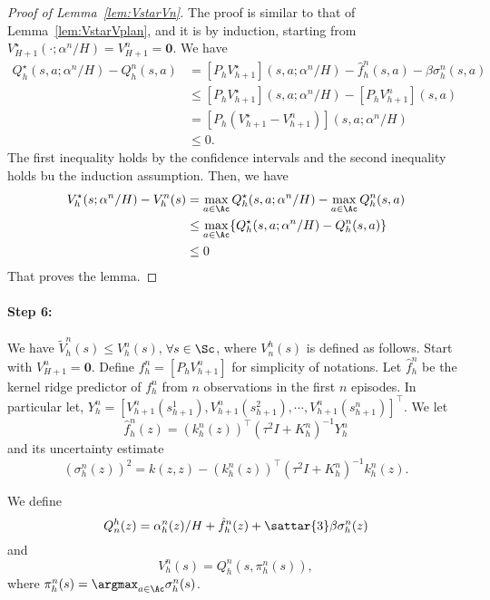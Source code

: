 \begin{proof}[Proof of Lemma~\ref{lem:VstarVn}]
The proof is similar to that of Lemma~\ref{lem:VstarVplan}, and it is by induction, starting from $V^{\star}_{H+1}(\cdot;\alpha^n/H) = V^n_{H+1}=\bm{0}$. We have
\begin{align*}
    Q^{\star}_h(s,a;\alpha^n/H) - Q^n_{h}(s,a) &= [P_hV^{\star}_{h+1}](s,a;\alpha^n/H) - \hat{f}^n_h(s,a)-\beta\sigma^n_h(s,a)\\
    &\le [P_hV^{\star}_{h+1}](s,a;\alpha^n/H) -[P_hV^n_{h+1}](s,a)\\
    &=[P_h(V^{\star}_{h+1}-V^n_{h+1})](s,a;\alpha^n/H)\\
    &\le 0. 
\end{align*}
The first inequality holds by the confidence intervals and the second inequality holds bu the induction assumption. 
Then, we have
\begin{align*}
    V^{\star}_h(s;\alpha^n/H) - V^n_h(s) &=
    \max_{a\in\Ac} Q^{\star}_h(s,a;\alpha^n/H) - \max_{a\in\Ac}Q^n_{h}(s,a)\\
    &\le \max_{a\in\Ac} \{Q^{\star}_h(s,a;\alpha^n/H) - Q^n_{h}(s,a)\}\\
    &\le 0
\end{align*}
That proves the lemma. 
\end{proof}

\paragraph{Step 6:} We have $\tilde{V}^n_h(s)\le {V}^n_h(s)$, $\forall s\in\Sc$, where ${V}^h_n(s)$ is defined as follows. 
Start with ${V}^n_{H+1}=\bm{0}$. Define ${f}_h^n=[P_h{V}^{n}_{h+1}]$ for simplicity of notations. Let $\hat{{f}}_h^n$ be the kernel ridge predictor of ${f}_h^n$ from $n$ observations in the first $n$ episodes. In particular let, ${Y}^{n}_h=[{V}^n_{h+1}(s^1_{h+1}), {V}^n_{h+1}(s^2_{h+1}), \cdots, {V}^n_{h+1}(s^n_{h+1})]^{\top}$. We let
\begin{equation*}
    \hat{{f}}_h^n(z) = (k^n_h(z))^{\top}(\tau^2I+K^n_h)^{-1}{Y}^{n}_h
\end{equation*}
and its uncertainty estimate
\begin{equation*}
    (\sigma_h^n(z))^2 = k(z,z)- (k^n_h(z))^{\top}(\tau^2I+K^n_h)^{-1}k^n_h(z).
\end{equation*}

We define 
\begin{equation}\label{eq:Qtilden}
    {Q}^h_n(z)= \alpha^n_h(z)/H +  \hat{{f}}_h^n(z) + \sattar{3}\beta\sigma_h^n(z)
\end{equation}
and 
\begin{equation}\label{eq:Vtilden}
    {V}^n_h(s)= {Q}^n_h(s,\pi^n_h(s)), 
\end{equation}
where $\pi^n_h(s) = \argmax_{a\in\Ac}\sigma^n_h(s)$.

